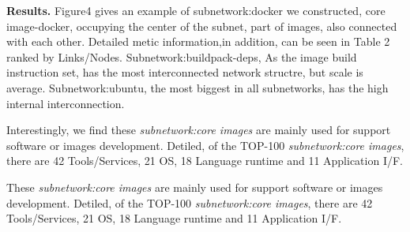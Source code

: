 \documentclass[sigconf]{acmart}
\begin{document}










\noindent\textbf{Results. }
Figure4 gives an example of subnetwork:docker we constructed, core image-docker, occupying the center of the subnet, part of images, also connected with each other. 
Detailed metic information,in addition, can be seen in Table 2 ranked by Links/Nodes. Subnetwork:buildpack-deps, As the image build instruction set, has the most interconnected network structre, but scale is average. Subnetwork:ubuntu, the most biggest in all subnetworks, has the high internal interconnection.

Interestingly,  we find these \emph{subnetwork:core images} are mainly used for support software or images development. Detiled, of the TOP-100 \emph{subnetwork:core images}, there are 42 Tools/Services, 21 OS, 18 Language runtime and 11 Application I/F.  



\begin{mybox}
These \emph{subnetwork:core images} are mainly used for support software or images development. Detiled, of the TOP-100 \emph{subnetwork:core images}, there are 42 Tools/Services, 21 OS, 18 Language runtime and 11 Application I/F.
\end{mybox}
\end{document}
